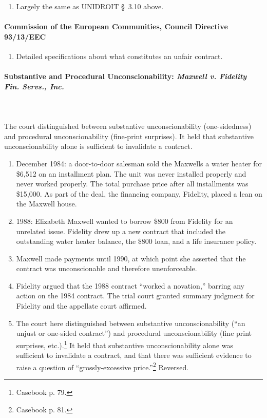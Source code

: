 \begin{enumerate}
    \item Largely the same as UNIDROIT \S\ 3.10 above.
\end{enumerate}

\paragraph{Commission of the European Communities, Council Directive 
93/13/EEC}

\begin{enumerate}
    \item Detailed specifications about what constitutes an unfair contract.
\end{enumerate}

\paragraph{Substantive and Procedural Unconscionability: \emph{Maxwell v. 
Fidelity Fin. Servs., Inc.}}
~\\\\
The court distinguished between substantive unconscionability (one-sidedness) 
and procedural unconscionability (fine-print surprises). It held that 
substantive unconscionability alone is sufficient to invalidate a contract.

\begin{enumerate}
    \item December 1984: a door-to-door salesman sold the Maxwells a water 
    heater for \$6,512 on an installment plan. The unit was never installed 
    properly and never worked properly. The total purchase price after all 
    installments was \$15,000. As part of the deal, the financing company, 
    Fidelity, placed a lean on the Maxwell house.
    \item 1988: Elizabeth Maxwell wanted to borrow \$800 from Fidelity for an 
    unrelated issue. Fidelity drew up a new contract that included the 
    outstanding water heater balance, the \$800 loan, and a life insurance 
    policy.
    \item Maxwell made payments until 1990, at which point she asserted that 
    the contract was unconscionable and therefore unenforceable.
    \item Fidelity argued that the 1988 contract ``worked a novation,'' 
    barring any action on the 1984 contract. The trial court granted summary 
    judgment for Fidelity and the appellate court affirmed.
    \item The court here distinguished between substantive unconscionability 
    (``an unjust or one-sided contract'') and procedural unconscionability 
    (fine print surprises, etc.).\footnote{Casebook p. 79.} It held that 
    substantive unconscionability alone was sufficient to invalidate a 
    contract, and that there was sufficient evidence to raise a question of 
    ``grossly-excessive price.''\footnote{Casebook p. 81.} Reversed.
\end{enumerate}

